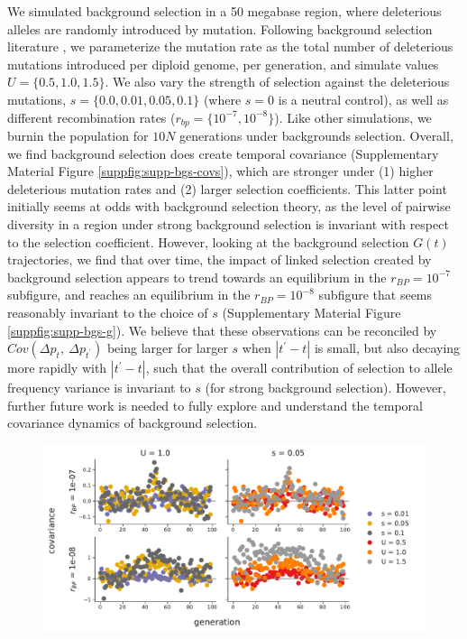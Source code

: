 \documentclass[11pt]{article}
\begin{document}
{We simulated background selection in a 50 megabase region, where deleterious
alleles are randomly introduced by mutation. Following background selection
literature
\parencite{Charlesworth1993-gb,Nordborg1996-nq,Hudson1994-oh,Hudson1995-xc}, we
parameterize the mutation rate as the total number of deleterious mutations
introduced per diploid genome, per generation, and simulate values $U = \{0.5,
1.0, 1.5\}$. We also vary the strength of selection against the deleterious
mutations, $s = \{0.0, 0.01, 0.05, 0.1\}$ (where $s=0$ is a neutral control),
as well as different recombination rates ($r_{bp} = \{10^{-7}, 10^{-8}\}$).
Like other simulations, we burnin the population for $10N$ generations under
backgrounds selection. Overall, we find background selection does create
temporal covariance (Supplementary Material Figure
\ref{suppfig:supp-bgs-covs}), which are stronger under (1) higher deleterious
mutation rates and (2) larger selection coefficients. This latter point
initially seems at odds with background selection theory, as the level of
pairwise diversity in a region under strong background selection is invariant
with respect to the selection coefficient. However, looking at the background
selection $G(t)$ trajectories, we find that over time, the impact of linked
selection created by background selection appears to trend towards an
equilibrium in the $r_{BP} = 10^{-7}$ subfigure, and reaches an equilibrium in
the $r_{BP} = 10^{-8}$ subfigure that seems reasonably invariant to the choice
of $s$ (Supplementary Material Figure \ref{suppfig:supp-bgs-g}). We believe
that these observations can be reconciled by $Cov(\Delta p_t,~ \Delta
p_{t^{\prime}})$ being larger for larger $s$ when $|t^{\prime}-t|$ is small,
but also decaying more rapidly with $|t^{\prime}-t|$, such that the overall
contribution of selection to allele frequency variance is invariant to $s$ (for
strong background selection). However, further future work is needed to fully
explore and understand the temporal covariance dynamics of background
selection.


\begin{figure}[!ht]
  \centering
  \includegraphics[width=\textwidth]{figures/fig-bgs-covars-without-fixations.pdf}


\end{figure}}
\end{document}

